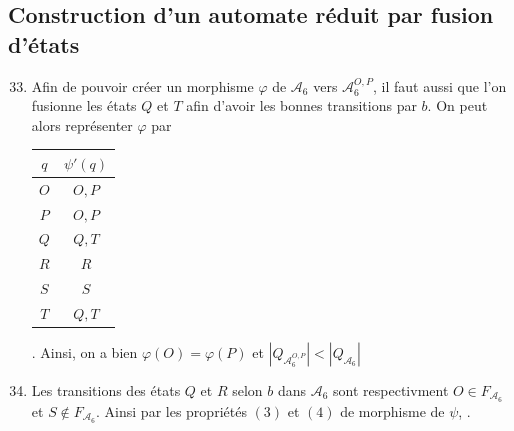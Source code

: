 \documentclass{article}
\begin{document}
\subsection{Construction d'un automate r\'eduit par fusion d'\'etats}

\begin{enumerate}
    \setcounter{enumi}{32}

    \item \begin{minipage}[t]{\linewidth}
        \centering
        \label{fig:fig3}
        \end{minipage}
    
    Afin de pouvoir créer un morphisme $\varphi$ de $\mathcal{A}_6$ vers $\mathcal{A}_6^{O, P}$, il faut aussi que l'on fusionne les états $Q$ et $T$ afin d'avoir les bonnes transitions par $b$. On peut alors représenter $\varphi$ par \begin{tabular}{|c|c|}
        \hline
        $q$ & $\psi'(q)$ \\
        \hline
        $O$ & $O, P$ \\
        \hline
        $P$ & $O, P$ \\
        \hline
        $Q$ & $Q, T$ \\
        \hline
        $R$ & $R$ \\
        \hline
        $S$ & $S$ \\
        \hline
        $T$ & $Q, T$ \\
        \hline
    \end{tabular}.
    Ainsi, on a bien $\varphi(O) = \varphi(P)$ et $|Q_{\mathcal{A}_6^{O, P}}| < |Q_{\mathcal{A}_6}|$

    \item Les transitions des états $Q$ et $R$ selon $b$ dans $\mathcal{A}_6$ sont respectivment $O \in F_{\mathcal{A}_6}$ et $S \notin F_{\mathcal{A}_6}$. Ainsi par les propriétés $(3)$ et $(4)$ de morphisme de $\psi$, .


\end{enumerate}
\end{document}
